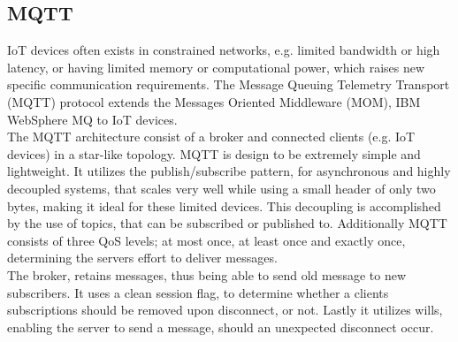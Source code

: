 \subsection{MQTT}
IoT devices often exists in constrained networks, e.g. limited bandwidth or high latency, or having limited memory or computational power, which raises new specific communication requirements. The Message Queuing Telemetry Transport (MQTT) protocol extends the Messages Oriented Middleware (MOM), IBM WebSphere MQ to IoT devices.\\
The MQTT architecture consist of a broker and connected clients (e.g. IoT devices) in a star-like topology. MQTT is design to be extremely simple and lightweight. It utilizes the publish/subscribe pattern, for asynchronous and highly decoupled systems, that scales very well while using a small header of only two bytes, making it ideal for these limited devices. This decoupling is accomplished by the use of topics, that can be subscribed or published to. Additionally MQTT consists of three QoS levels; at most once, at least once and exactly once, determining the servers effort to deliver messages.\\
The broker, retains messages, thus being able to send old message to new subscribers. It uses a clean session flag, to determine whether a clients subscriptions should be removed upon disconnect, or not. Lastly it utilizes wills, enabling the server to send a message, should an unexpected disconnect occur.

